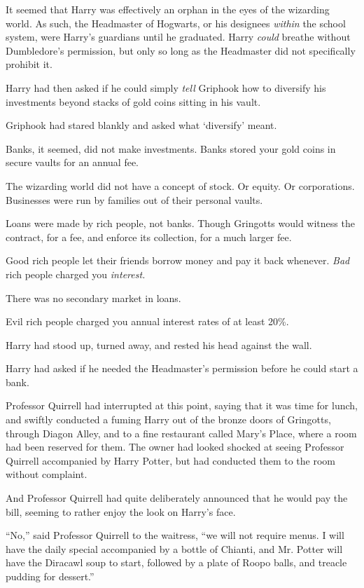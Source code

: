 It seemed that Harry was effectively an orphan in the eyes of the wizarding world. As such, the Headmaster of Hogwarts, or his designees \emph{within} the school system, were Harry's guardians until he graduated. Harry \emph{could} breathe without Dumbledore's permission, but only so long as the Headmaster did not specifically prohibit it.

Harry had then asked if he could simply \emph{tell} Griphook how to diversify his investments beyond stacks of gold coins sitting in his vault.

Griphook had stared blankly and asked what `diversify' meant.

Banks, it seemed, did not make investments. Banks stored your gold coins in secure vaults for an annual fee.

The wizarding world did not have a concept of stock. Or equity. Or corporations. Businesses were run by families out of their personal vaults.

Loans were made by rich people, not banks. Though Gringotts would witness the contract, for a fee, and enforce its collection, for a much larger fee.

Good rich people let their friends borrow money and pay it back whenever. \emph{Bad} rich people charged you \emph{interest.}

There was no secondary market in loans.

Evil rich people charged you annual interest rates of at least 20\%.

Harry had stood up, turned away, and rested his head against the wall.

Harry had asked if he needed the Headmaster's permission before he could start a bank.

Professor Quirrell had interrupted at this point, saying that it was time for lunch, and swiftly conducted a fuming Harry out of the bronze doors of Gringotts, through Diagon Alley, and to a fine restaurant called Mary's Place, where a room had been reserved for them. The owner had looked shocked at seeing Professor Quirrell accompanied by Harry Potter, but had conducted them to the room without complaint.

And Professor Quirrell had quite deliberately announced that he would pay the bill, seeming to rather enjoy the look on Harry's face.

``No,'' said Professor Quirrell to the waitress, ``we will not require menus. I will have the daily special accompanied by a bottle of Chianti, and Mr. Potter will have the Diracawl soup to start, followed by a plate of Roopo balls, and treacle pudding for dessert.''


